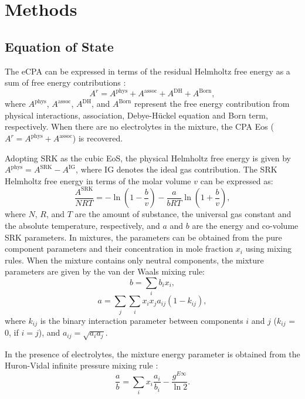 \section{Methods}
\subsection{Equation of State}
The eCPA can be expressed in terms of the residual Helmholtz free energy as a sum of free energy contributions \cite{Wu1998, Maribo2015}:
\begin{equation}
        A^r = A^\text{phys} + A^\text{assoc} + A^\text{DH} + A^\text{Born},
        \label{Eq:A_eCPA}
\end{equation}
where $A^\text{phys}$, $A^\text{assoc}$, $A^\text{DH}$, and $A^\text{Born}$ represent the free energy contribution from physical interactions, association, Debye-H\"uckel equation and Born term, respectively. When there are no electrolytes in the mixture, the CPA Eos ($A^r = A^\text{phys} + A^\text{assoc}$) is recovered.

Adopting SRK as the cubic EoS, the physical Helmholtz free energy is given by $A^\text{phys} = A^\text{SRK} -A^\text{IG}$, where IG denotes the ideal gas contribution. The SRK Helmholtz free energy \cite{Soave1972} in terms of the molar volume $v$  can be expressed as:
\begin{equation}
        \frac{A^\text{SRK}}{NRT} = - \ln { \left (1-\frac{b}{v}\right )} - \frac{a}{bRT} \ln {\left (1+\frac{b}{v}\right )},
        \label{Eq: Asrk}
\end{equation}
where $N$, $R$, and $T$ are the amount of substance, the universal gas constant and the absolute temperature, respectively, and $a$ and $b$ are the energy and co-volume SRK parameters. In mixtures, the parameters can be obtained from the pure component parameters and their concentration in mole fraction $x_i$ using mixing rules. When the mixture contains only neutral components, the mixture parameters are given by the van der Waals mixing rule:
\begin{equation}
    b = \sum_i b_ix_i,
    \label{Eq:CPA_b}
\end{equation}
\begin{equation}
    a = \sum_j \sum_i x_ix_ja_{ij} \left (1-k_{ij} \right),
    \label{Eq:CPA_a}
\end{equation} 
where $k_{ij}$ is the binary interaction parameter between components $i$ and $j$ ($k_{ij}$ = 0, if $i=j$), and $a_{ij}= \sqrt{a_ia_j}$.

In the presence of electrolytes, the mixture energy parameter is obtained from the Huron-Vidal infinite pressure mixing rule \cite{Maribo2015}:
\begin{equation}
        \frac{a}{b} = \sum_i x_i \frac{a_i}{b_i} - \frac{g^{E\infty}}{\ln{2}}.
        \label{Eq:HuronVidal}
\end{equation}

